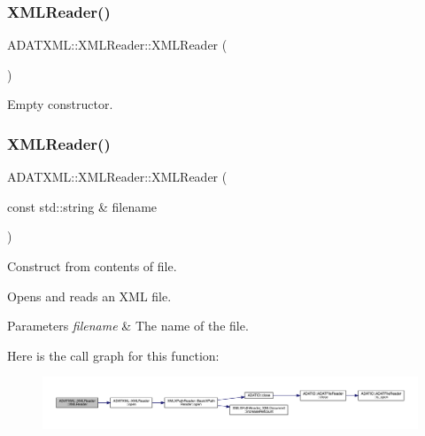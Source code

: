 \subsubsection{\texorpdfstring{XMLReader()}{XMLReader()}\hspace{0.1cm}{\footnotesize\ttfamily [6/10]}}
{\footnotesize\ttfamily A\+D\+A\+T\+X\+M\+L\+::\+X\+M\+L\+Reader\+::\+X\+M\+L\+Reader (\begin{DoxyParamCaption}{ }\end{DoxyParamCaption})\hspace{0.3cm}{\ttfamily [inline]}}



Empty constructor. 

\mbox{\label{classADATXML_1_1XMLReader_a85d8af8a27febdd66251e20bd96ccc32}} 
\subsubsection{\texorpdfstring{XMLReader()}{XMLReader()}\hspace{0.1cm}{\footnotesize\ttfamily [7/10]}}
{\footnotesize\ttfamily A\+D\+A\+T\+X\+M\+L\+::\+X\+M\+L\+Reader\+::\+X\+M\+L\+Reader (\begin{DoxyParamCaption}\item[{const std\+::string \&}]{filename }\end{DoxyParamCaption})\hspace{0.3cm}{\ttfamily [inline]}}



Construct from contents of file. 

Opens and reads an X\+ML file. 
\begin{DoxyParams}{Parameters}
{\em filename} & The name of the file. \\
\hline
\end{DoxyParams}
Here is the call graph for this function\+:
\nopagebreak
\begin{figure}[H]
\begin{center}
\leavevmode
\includegraphics[width=350pt]{db/d3f/classADATXML_1_1XMLReader_a85d8af8a27febdd66251e20bd96ccc32_cgraph}
\end{center}
\end{figure}
\mbox{\label{classADATXML_1_1XMLReader_a8025cb1c53d6ceb8a694bdbd8e1f383b}} 
